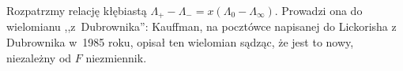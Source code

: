 Rozpatrzmy relację kłębiastą $\Lambda_+ - \Lambda_- = x(\Lambda_0 - \Lambda_\infty)$.
Prowadzi ona do wielomianu ,,z~Dubrownika'': Kauffman, na pocztówce napisanej do Lickorisha z Dubrownika w~1985 roku, opisał ten wielomian sądząc, że jest to nowy, niezależny od $F$ niezmiennik.



